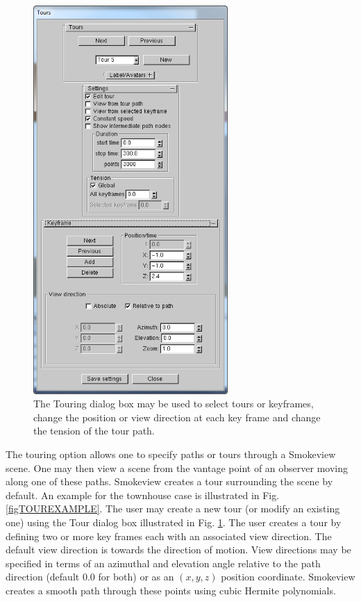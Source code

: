 \documentclass[11pt,twoside]{book}
\begin{document}
\begin{figure}[bph]
\begin{center}
\includegraphics[width=2.916667in]{FIGURES/figTOUR}
\end{center}
\caption[Touring dialog box.]{The Touring dialog
box may be used to select tours or keyframes, change the
position or view direction at each key frame and change the tension
of the tour path. }
 \label{figTOUR}
\end{figure}

The touring option allows one to specify paths or tours through a
Smokeview scene.  One may then view a scene from the vantage point of an
observer moving along one of these paths. Smokeview creates a tour surrounding
the scene by default.  An example for the townhouse case is illustrated
in Fig. \ref{figTOUREXAMPLE}.
The user may create a new tour (or modify an existing one) using the Tour
dialog box illustrated in Fig. \ref{figTOUR}. The user creates a tour by
defining two or more key frames each with an associated view direction.
The default view direction is towards the direction of
motion.  View directions may be specified in terms of an azimuthal and
elevation angle relative to the path direction (default 0.0 for both)
or as an $(x,y,z)$ position coordinate.  Smokeview creates a smooth
path through these points using cubic Hermite polynomials.
\end{document}
